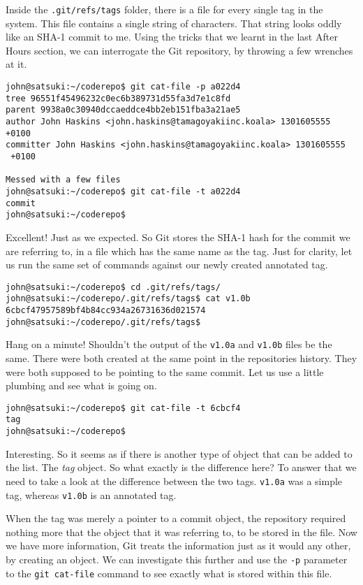 Inside the \texttt{.git/refs/tags} folder, there is a file for every single tag in the system.  This file contains a single string of characters.  That string looks oddly like an SHA-1 commit to me.  Using the tricks that we learnt in the last After Hours section, we can interrogate the Git repository, by throwing a few wrenches at it.

\begin{Verbatim}
john@satsuki:~/coderepo$ git cat-file -p a022d4
tree 96551f45496232c0ec6b389731d55fa3d7e1c8fd
parent 9938a0c30940dccaeddce4bb2eb151fba3a21ae5
author John Haskins <john.haskins@tamagoyakiinc.koala> 1301605555 +0100
committer John Haskins <john.haskins@tamagoyakiinc.koala> 1301605555 
 +0100

Messed with a few files
john@satsuki:~/coderepo$ git cat-file -t a022d4
commit
john@satsuki:~/coderepo$ 
\end{Verbatim}

Excellent!  Just as we expected.  So Git stores the SHA-1 hash for the commit we are referring to, in a file which has the same name as the tag.  Just for clarity, let us run the same set of commands against our newly created annotated tag.

\begin{Verbatim}
john@satsuki:~/coderepo$ cd .git/refs/tags/
john@satsuki:~/coderepo/.git/refs/tags$ cat v1.0b
6cbcf47957589bf4b84cc934a26731636d021574
john@satsuki:~/coderepo/.git/refs/tags$ 
\end{Verbatim}

Hang on a minute!  Shouldn't the output of the \texttt{v1.0a} and \texttt{v1.0b} files be the same.  There were both created at the same point in the repositories history.  They were both supposed to be pointing to the same commit.  Let us use a little plumbing and see what is going on.

\begin{Verbatim}
john@satsuki:~/coderepo$ git cat-file -t 6cbcf4
tag
john@satsuki:~/coderepo$ 
\end{Verbatim}

Interesting.  So it seems as if there is another type of object that can be added to the list.  The \emph{tag} object.  So what exactly is the difference here?  To answer that we need to take a look at the difference between the two tags.  \texttt{v1.0a} was a simple tag, whereas \texttt{v1.0b} is an annotated tag.  

When the tag was merely a pointer to a commit object, the repository required nothing more that the object that it was referring to, to be stored in the file.  Now we have more information, Git treats the information just as it would any other, by creating an object.  We can investigate this further and use the \texttt{-p} parameter to the \texttt{git cat-file} command to see exactly what is stored within this file.

